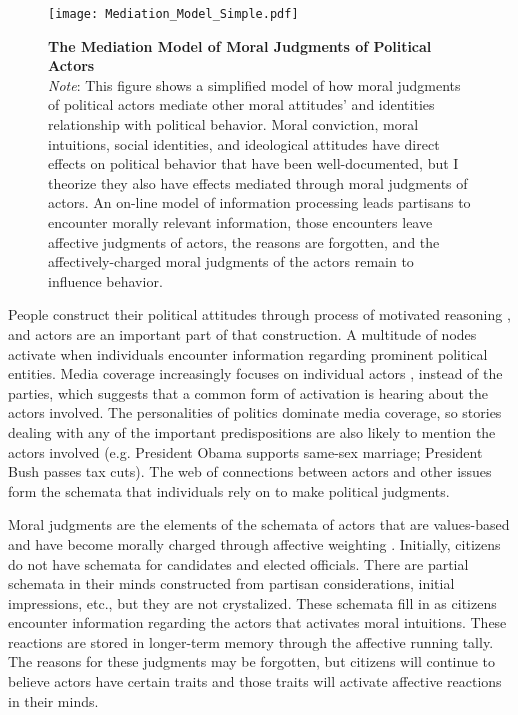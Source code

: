 \begin{figure}[htb]
  \centering
  \caption[The Mediation Model of Moral Judgments of Political Actors]{\textbf{The Mediation Model of Moral Judgments of Political Actors}\\ \footnotesize \textit{Note}: This figure shows a simplified model of how moral judgments of political actors mediate other moral attitudes' and identities relationship with political behavior. Moral conviction, moral intuitions, social identities, and ideological attitudes have direct effects on political behavior that have been well-documented, but I theorize they also have effects mediated through moral judgments of actors. An on-line model of information processing leads partisans to encounter morally relevant information, those encounters leave affective judgments of actors, the reasons are forgotten, and the affectively-charged moral judgments of the actors remain to influence behavior.}\label{fig:theory_mediation_model}
  {\texttt{[image: Mediation\_Model\_Simple.pdf]}} \\
\end{figure}

People construct their political attitudes through process of motivated reasoning \cite{TaberLodgeGlathar2001}, and actors are an important part of that construction. A multitude of nodes activate when individuals encounter information regarding prominent political entities. Media coverage increasingly focuses on individual actors \cite{McAllister2007}, instead of the parties, which suggests that a common form of activation is hearing about the actors involved. The personalities of politics dominate media coverage, so stories dealing with any of the important predispositions are also likely to mention the actors involved (e.g. President Obama supports same-sex marriage; President Bush passes tax cuts). The web of connections between actors and other issues form the schemata that individuals rely on to make political judgments.

Moral judgments are the elements of the schemata of actors that are values-based and have become morally charged through affective weighting \cite{TaberLodgeGlathar2001}. Initially, citizens do not have schemata for candidates and elected officials. There are partial schemata in their minds constructed from partisan considerations, initial impressions, etc., but they are not crystalized. These schemata fill in as citizens encounter information regarding the actors that activates moral intuitions. These reactions are stored in longer-term memory through the affective running tally. The reasons for these judgments may be forgotten, but citizens will continue to believe actors have certain traits and those traits will activate affective reactions in their minds.

